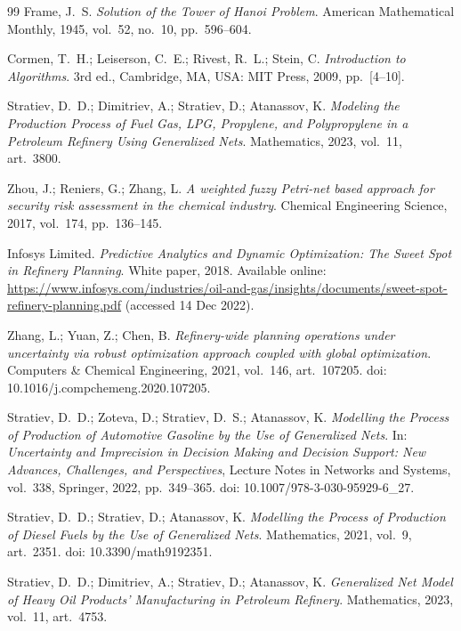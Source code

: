 \begin{thebibliography}{99}
Frame, J.~S.
\newblock \emph{Solution of the Tower of Hanoi Problem}.
\newblock American Mathematical Monthly, 1945, vol.~52, no.~10, pp.~596--604.

Cormen, T.~H.; Leiserson, C.~E.; Rivest, R.~L.; Stein, C.
\newblock \emph{Introduction to Algorithms}.
\newblock 3rd ed., Cambridge, MA, USA: MIT Press, 2009, pp.~[4--10].

Stratiev, D.~D.; Dimitriev, A.; Stratiev, D.; Atanassov, K.
\newblock \emph{Modeling the Production Process of Fuel Gas, LPG, Propylene, and Polypropylene in a Petroleum Refinery Using Generalized Nets}.
\newblock Mathematics, 2023, vol.~11, art.~3800.

Zhou, J.; Reniers, G.; Zhang, L.
\newblock \emph{A weighted fuzzy Petri-net based approach for security risk assessment in the chemical industry}.
\newblock Chemical Engineering Science, 2017, vol.~174, pp.~136--145.

Infosys Limited.
\newblock \emph{Predictive Analytics and Dynamic Optimization: The Sweet Spot in Refinery Planning}.
\newblock White paper, 2018.
\newblock Available online: \url{https://www.infosys.com/industries/oil-and-gas/insights/documents/sweet-spot-refinery-planning.pdf} (accessed 14 Dec 2022).

Zhang, L.; Yuan, Z.; Chen, B.
\newblock \emph{Refinery-wide planning operations under uncertainty via robust optimization approach coupled with global optimization}.
\newblock Computers \& Chemical Engineering, 2021, vol.~146, art.~107205.
\newblock doi: 10.1016/j.compchemeng.2020.107205.

Stratiev, D.~D.; Zoteva, D.; Stratiev, D.~S.; Atanassov, K.
\newblock \emph{Modelling the Process of Production of Automotive Gasoline by the Use of Generalized Nets}.
\newblock In: \emph{Uncertainty and Imprecision in Decision Making and Decision Support: New Advances, Challenges, and Perspectives},
Lecture Notes in Networks and Systems, vol.~338, Springer, 2022, pp.~349--365.
\newblock doi: 10.1007/978-3-030-95929-6\_27.

Stratiev, D.~D.; Stratiev, D.; Atanassov, K.
\newblock \emph{Modelling the Process of Production of Diesel Fuels by the Use of Generalized Nets}.
\newblock Mathematics, 2021, vol.~9, art.~2351.
\newblock doi: 10.3390/math9192351.

Stratiev, D.~D.; Dimitriev, A.; Stratiev, D.; Atanassov, K.
\newblock \emph{Generalized Net Model of Heavy Oil Products' Manufacturing in Petroleum Refinery}.
\newblock Mathematics, 2023, vol.~11, art.~4753.


\end{thebibliography}
